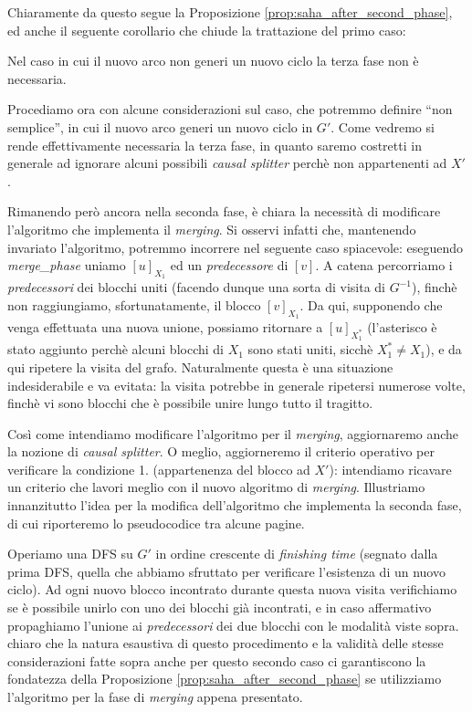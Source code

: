 Chiaramente da questo segue la Proposizione \ref{prop:saha_after_second_phase}, ed anche il seguente corollario che chiude la trattazione del primo caso:
\begin{corollary}
    Nel caso in cui il nuovo arco non generi un nuovo ciclo la terza fase non è necessaria.
\end{corollary}

Procediamo ora con alcune considerazioni sul caso, che potremmo definire ``non semplice'', in cui il nuovo arco generi un nuovo ciclo in $G'$. Come vedremo si rende effettivamente necessaria la terza fase, in quanto saremo costretti in generale ad ignorare alcuni possibili \emph{causal splitter} perchè non appartenenti ad $X'$.

Rimanendo però ancora nella seconda fase, è chiara la necessità di modificare l'algoritmo che implementa il \emph{merging}. Si osservi infatti che, mantenendo invariato l'algoritmo, potremmo incorrere nel seguente caso spiacevole: eseguendo \emph{merge\_phase} uniamo $[u]_{X_1}$ ed un \emph{predecessore} di $[v]$. A catena percorriamo i \emph{predecessori} dei blocchi uniti (facendo dunque una sorta di visita di $G^{-1}$), finchè non raggiungiamo, sfortunatamente, il blocco $[v]_{X_1}$. Da qui, supponendo che venga effettuata una nuova unione, possiamo ritornare a $[u]_{X_1^*}$ (l'asterisco è stato aggiunto perchè alcuni blocchi di $X_1$ sono stati uniti, sicchè $X_1^* \neq X_1$), e da qui ripetere la visita del grafo. Naturalmente questa è una situazione indesiderabile e va evitata: la visita potrebbe in generale ripetersi numerose volte, finchè vi sono blocchi che è possibile unire lungo tutto il tragitto.

Così come intendiamo modificare l'algoritmo per il \emph{merging}, aggiornaremo anche la nozione di \emph{causal splitter}. O meglio, aggiorneremo il criterio operativo per verificare la condizione 1. (appartenenza del blocco ad $X'$): intendiamo ricavare un criterio che lavori meglio con il nuovo algoritmo di \emph{merging}. Illustriamo innanzitutto l'idea per la modifica dell'algoritmo che implementa la seconda fase, di cui riporteremo lo pseudocodice tra alcune pagine.

Operiamo una DFS su $G'$ in ordine crescente di \emph{finishing time} (segnato dalla prima DFS, quella che abbiamo sfruttato per verificare l'esistenza di un nuovo ciclo). Ad ogni nuovo blocco incontrato durante questa nuova visita verifichiamo se è possibile unirlo con uno dei blocchi già incontrati, e in caso affermativo propaghiamo l'unione ai \emph{predecessori} dei due blocchi con le modalità viste sopra. \accente chiaro che la natura esaustiva di questo procedimento e la validità delle stesse considerazioni fatte sopra anche per questo secondo caso ci garantiscono la fondatezza della Proposizione \ref{prop:saha_after_second_phase} se utilizziamo l'algoritmo per la fase di \emph{merging} appena presentato.

